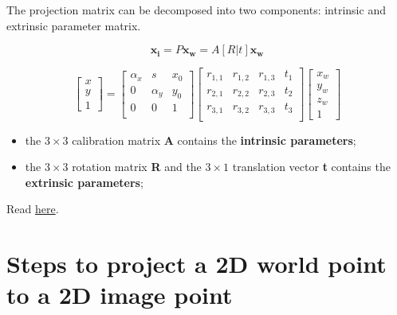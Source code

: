 \documentclass{article}
\begin{document}
The projection matrix can be decomposed into two components: intrinsic and extrinsic parameter matrix.

\begin{equation*}
    \boldsymbol{x_i} = P\boldsymbol{x_w} = A[R|t]\boldsymbol{x_w}
\end{equation*}

\begin{equation*}
    \begin{bmatrix}
        x \\ y \\ 1
    \end{bmatrix} = 
    \begin{bmatrix}
        \alpha_x & s & x_0 \\
        0 & \alpha_y & y_0 \\
        0 & 0 & 1 \\
    \end{bmatrix}
    \begin{bmatrix}
        r_{1, 1} & r_{1, 2} & r_{1, 3} & 
        t_1 \\
        r_{2, 1} & r_{2, 2} & r_{2, 3} & 
        t_2 \\
        r_{3, 1} & r_{3, 2} & r_{3, 3} & 
        t_3 \\
    \end{bmatrix}
    \begin{bmatrix}
        x_w \\ y_w \\ z_w \\ 1
    \end{bmatrix}
\end{equation*}

\begin{itemize}
    \item the $3\times 3$ calibration matrix \textbf{A} contains the \textbf{intrinsic parameters};
    \item the $3\times 3$ rotation matrix \textbf{R} and the $3\times 1$ translation vector \textbf{t} contains the \textbf{extrinsic parameters}; 
\end{itemize}

Read \href{https://www.analyticsvidhya.com/blog/2021/10/a-comprehensive-guide-for-camera-calibration-in-computer-vision/}{here}.

\newpage

\section*{Steps to project a 2D world point to a 2D image point}
\end{document}
